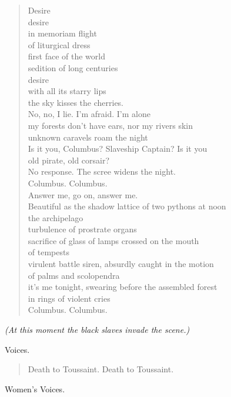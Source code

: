\documentclass[letterpaper,article,12pt,oneside,notitlepage]{memoir}
\begin{document}
\begin{verse}
Desire \\
desire \\
in memoriam flight \\
of liturgical dress \\
first face of the world \\
sedition of long centuries \\
desire \\
with all its starry lips \\
the sky kisses the cherries. \\
No, no, I lie. I'm afraid. I'm alone \\
my forests don't have ears, nor my rivers skin \\
unknown caravels roam the night \\
Is it you, Columbus? Slaveship Captain? Is it you \\
old pirate, old corsair? \\
No response. The scree widens the night. \\
Columbus. Columbus. \\
Answer me, go on, answer me. \\
Beautiful as the shadow lattice of two pythons at noon \\
the archipelago \\
turbulence of prostrate organs \\
sacrifice of glass of lamps crossed on the mouth \\
of tempests \\
virulent battle siren, absurdly caught in the motion \\
of palms and scolopendra \\
it's me tonight, swearing before the assembled forest \\
in rings of violent cries \\
Columbus. Columbus. \\
\end{verse}

\textit{(At this moment the black slaves invade the scene.)}

\begin{center}Voices.\end{center}

\begin{verse}
Death to Toussaint. Death to Toussaint. \\
\end{verse}

\begin{center}Women's Voices.\end{center}
\end{document}
